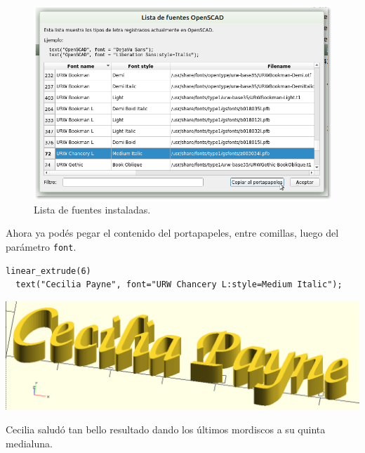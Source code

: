 \begin{figure}[ht]
  \centering
  \includegraphics[width=.9\textwidth]{imagenes/font-list}  
  \caption{Lista de fuentes instaladas.}
  \label{fig:font-list}
\end{figure}


\guillemotright Ahora ya podés pegar el contenido del portapapeles,
entre comillas, luego del parámetro \lstinline!font!.

\begin{center}
\begin{minipage}[]{.49\textwidth}%
 \begin{lstlisting}
linear_extrude(6)
  text("Cecilia Payne", font="URW Chancery L:style=Medium Italic");
\end{lstlisting}%
\end{minipage}\hfill
\begin{minipage}[]{.51\textwidth}%
  \centering
  \includegraphics[width=1\textwidth]{imagenes/payne-font}
\end{minipage}
\end{center}

Cecilia saludó tan bello resultado dando los últimos mordiscos a su
quinta medialuna.


